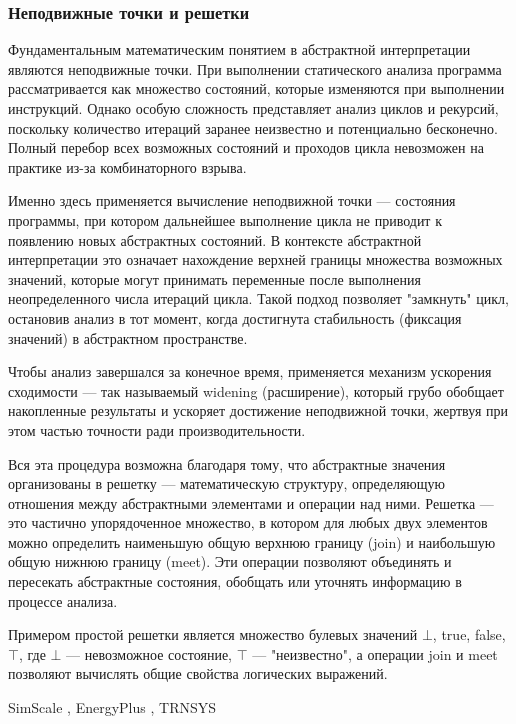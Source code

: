 \subsubsection*{Неподвижные точки и решетки}

Фундаментальным математическим понятием в абстрактной интерпретации являются неподвижные точки. При выполнении статического анализа программа рассматривается как множество состояний, которые изменяются при выполнении инструкций. Однако особую сложность представляет анализ циклов и рекурсий, поскольку количество итераций заранее неизвестно и потенциально бесконечно. Полный перебор всех возможных состояний и проходов цикла невозможен на практике из-за комбинаторного взрыва.

Именно здесь применяется вычисление неподвижной точки — состояния программы, при котором дальнейшее выполнение цикла не приводит к появлению новых абстрактных состояний. В контексте абстрактной интерпретации это означает нахождение верхней границы множества возможных значений, которые могут принимать переменные после выполнения неопределенного числа итераций цикла. Такой подход позволяет "замкнуть" цикл, остановив анализ в тот момент, когда достигнута стабильность (фиксация значений) в абстрактном пространстве.

Чтобы анализ завершался за конечное время, применяется механизм ускорения сходимости — так называемый widening (расширение), который грубо обобщает накопленные результаты и ускоряет достижение неподвижной точки, жертвуя при этом частью точности ради производительности.

Вся эта процедура возможна благодаря тому, что абстрактные значения организованы в решетку — математическую структуру, определяющую отношения между абстрактными элементами и операции над ними. Решетка — это частично упорядоченное множество, в котором для любых двух элементов можно определить наименьшую общую верхнюю границу (join) и наибольшую общую нижнюю границу (meet). Эти операции позволяют объединять и пересекать абстрактные состояния, обобщать или уточнять информацию в процессе анализа.

Примером простой решетки является множество булевых значений {$\bot$, true, false, $\top$}, где $\bot$ — невозможное состояние, $\top$ — "неизвестно", а операции join и meet позволяют вычислять общие свойства логических выражений.

\newpage
{}



\newpage
{}
SimScale \cite{simscale}, EnergyPlus \cite{energyplus}, TRNSYS \cite{trnsys}

\newpage
